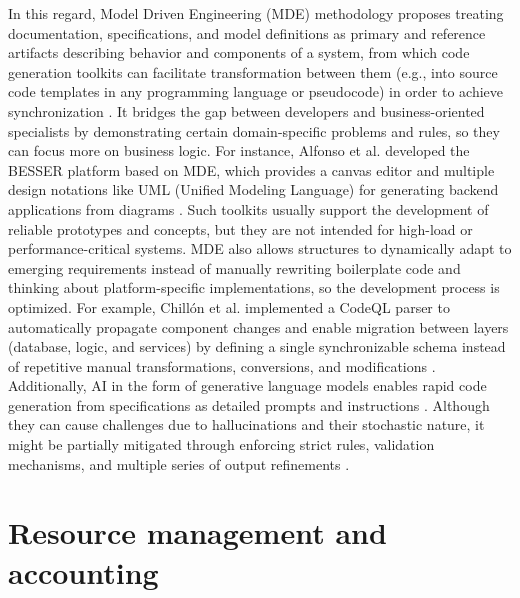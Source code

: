In this regard, Model Driven Engineering (MDE) methodology proposes treating documentation, specifications, and model definitions as primary and reference artifacts describing behavior and components of a system, from which code generation toolkits can facilitate transformation between them (e.g., into source code templates in any programming language or pseudocode) in order to achieve synchronization \cite{verbruggen2023practitioners}. It bridges the gap between developers and business-oriented specialists by demonstrating certain domain-specific problems and rules, so they can focus more on business logic. For instance, Alfonso et al. developed the BESSER platform based on MDE, which provides a canvas editor and multiple design notations like UML (Unified Modeling Language) for generating backend applications from diagrams \cite{alfonso2024building}. Such toolkits usually support the development of reliable prototypes and concepts, but they are not intended for high-load or performance-critical systems. MDE also allows structures to dynamically adapt to emerging requirements instead of manually rewriting boilerplate code and thinking about platform-specific implementations, so the development process is optimized. For example, Chillón et al. implemented a CodeQL parser to automatically propagate component changes and enable migration between layers (database, logic, and services) by defining a single synchronizable schema instead of repetitive manual transformations, conversions, and modifications \cite{chillon2023propagating}. Additionally, AI in the form of generative language models enables rapid code generation from specifications as detailed prompts and instructions \cite{stoica2024specifications}. Although they can cause challenges due to hallucinations and their stochastic nature, it might be partially mitigated through enforcing strict rules, validation mechanisms, and multiple series of output refinements \cite{shankar2024who}.

\section{Resource management and accounting}


